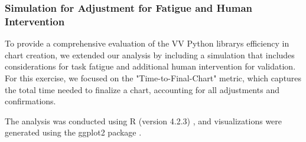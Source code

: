 \subsubsection{Simulation for Adjustment for Fatigue and Human
Intervention}\label{simulation-for-adjustment-for-fatigue-and-human-intervention}

To provide a comprehensive evaluation of the VV Python
library\textquotesingle s efficiency in chart creation, we extended our
analysis by including a simulation that includes considerations for task
fatigue and additional human intervention for validation. For this
exercise, we focused on the "Time-to-Final-Chart" metric, which captures
the total time needed to finalize a chart, accounting for all
adjustments and confirmations.

The analysis was conducted using R (version 4.2.3)
\cite{41}, and visualizations
were generated using the ggplot2 package
\cite{13}.
